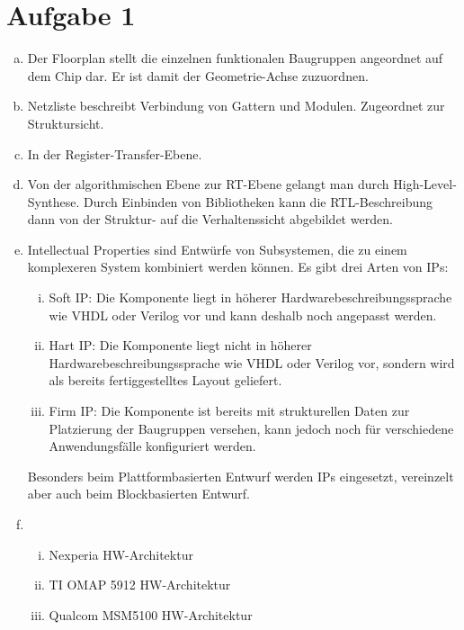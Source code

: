 \documentclass[a4paper]{scrartcl}
\begin{document}
	
	\section*{Aufgabe 1}
	
	\begin{enumerate}[(a)]
		\item Der Floorplan stellt die einzelnen funktionalen Baugruppen angeordnet auf dem Chip dar. Er ist damit der Geometrie-Achse zuzuordnen.
		\item Netzliste beschreibt Verbindung von Gattern und Modulen. Zugeordnet zur Struktursicht.		
		\item In der Register-Transfer-Ebene.
		\item Von der algorithmischen Ebene zur RT-Ebene gelangt man durch High-Level-Synthese. Durch Einbinden von Bibliotheken kann die RTL-Beschreibung dann von der Struktur- auf die Verhaltenssicht abgebildet werden.
		\item Intellectual Properties sind Entwürfe von Subsystemen, die zu einem komplexeren System kombiniert werden können. 
		Es gibt drei Arten von IPs:
		
		\begin{enumerate}[i.]
			\item Soft IP: Die Komponente liegt in höherer Hardwarebeschreibungssprache wie VHDL oder Verilog vor und kann deshalb noch angepasst werden.
			\item Hart IP: Die Komponente liegt nicht in höherer Hardwarebeschreibungssprache wie VHDL oder Verilog vor, sondern wird als bereits fertiggestelltes Layout geliefert.
			\item Firm IP:  Die Komponente ist bereits mit strukturellen Daten zur Platzierung der Baugruppen versehen, kann jedoch noch für verschiedene Anwendungsfälle konfiguriert werden. 
		\end{enumerate}		
				
		Besonders beim Plattformbasierten Entwurf werden IPs eingesetzt, vereinzelt aber auch beim Blockbasierten Entwurf.
		\item \hfil
		
		\begin{enumerate}[i.]
			\item Nexperia HW-Architektur
			\item TI OMAP 5912 HW-Architektur
			\item Qualcom MSM5100 HW-Architektur
		\end{enumerate}
	\end{enumerate}

	
\end{document}
